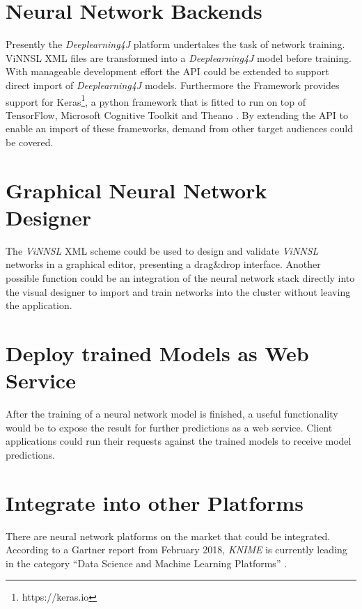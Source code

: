 \section{Neural Network Backends}\label{neural-network-backends}

Presently the \emph{Deeplearning4J} platform undertakes the task of
network training. ViNNSL XML files are transformed into a
\emph{Deeplearning4J} model before training. With manageable development
effort the API could be extended to support direct import of
\emph{Deeplearning4J} models. Furthermore the Framework provides support
for Keras\footnote{https://keras.io}, a python framework that is fitted
to run on top of TensorFlow, Microsoft Cognitive Toolkit and Theano
\cite{dl4j-keras} \cite{keras}. By extending the API to enable an import
of these frameworks, demand from other target audiences could be
covered.

\section{Graphical Neural Network
Designer}\label{graphical-neural-network-designer}

The \emph{ViNNSL} XML scheme could be used to design and validate
\emph{ViNNSL} networks in a graphical editor, presenting a drag\&drop
interface. Another possible function could be an integration of the
neural network stack directly into the visual designer to import and
train networks into the cluster without leaving the application.

\section{Deploy trained Models as Web
Service}\label{deploy-trained-models-as-web-service}

After the training of a neural network model is finished, a useful
functionality would be to expose the result for further predictions as a
web service. Client applications could run their requests against the
trained models to receive model predictions.

\section{Integrate into other
Platforms}\label{integrate-into-other-platforms}

There are neural network platforms on the market that could be
integrated. According to a Gartner report from February 2018,
\emph{KNIME} is currently leading in the category ``Data Science and
Machine Learning Platforms'' \cite{gartner}.


